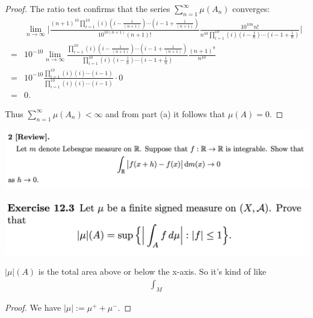 \begin{enumerate}[label=(\alph*)]
\begin{proof}
  The ratio test confirms that the series $\sum_{n=1}^\infty \mu(A_n)$ converges:
  \begin{align*}
    &\lim_{n\to\infty} \Bigg|\frac{(n+1)^{10}\prod_{i=1}^{10} (i)(i -\frac{1}{(n+1)} )\cdots(i - 1 +\frac{1}{(n+1)} )}{10^{10(n+1)}(n+1)!}     \frac{10^{10n}n!}{n^{10}\prod_{i=1}^{10} (i)(i -\frac{1}{n} )\cdots(i - 1 +\frac{1}{n} )}\Bigg| \\
    = &10^{-10}\lim_{n\to\infty} \frac{\prod_{i=1}^{10} (i)(i -\frac{1}{(n+1)} )\cdots(i - 1 +\frac{1}{(n+1)} )}{\prod_{i=1}^{10} (i)(i -\frac{1}{n} )\cdots(i - 1 +\frac{1}{n} )}     \frac{(n+1)^{9}}{n^{10}} \\
    = &10^{-10}\frac{\prod_{i=1}^{10} (i)(i )\cdots(i - 1  )}{\prod_{i=1}^{10} (i)(i )\cdots(i - 1 )}   \cdot  0 \\
    = &0.
  \end{align*}

  Thus $\sum_{n=1}^\infty \mu(A_n) < \infty$ and from part (a) it follows that $\mu(A) = 0$.
\end{proof}
\end{enumerate}

\newpage
\begin{mdframed}
\includegraphics[width=400pt]{img/analysis--berkeley-202a-hw10-5e9e.png}
\end{mdframed}


\newpage
\begin{mdframed}
\includegraphics[width=400pt]{img/analysis--berkeley-202a-hw10-551e.png}
\end{mdframed}

\begin{intuition*}
  $|\mu|(A)$ is the total area above or below the x-axis. So it's kind of like
  \begin{align*}
    \int_M
  \end{align*}
\end{intuition*}

\begin{proof}
  We have $|\mu| := \mu^+ + \mu^-$.


\end{proof}


